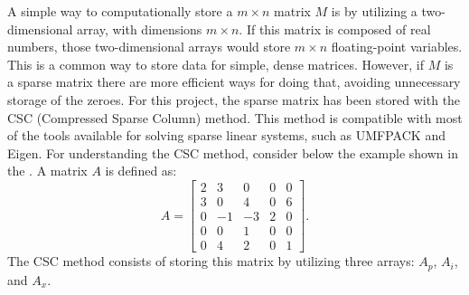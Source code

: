 A simple way to computationally store a $m \times n$ matrix $M$ is by utilizing a two-dimensional array, with dimensions $m \times n$. If this matrix is composed of real numbers, those two-dimensional arrays would store $m \times n$ floating-point variables. This is a common way to store data for simple, dense matrices. However, if $M$ is a sparse matrix there are more efficient ways for doing that, avoiding unnecessary storage of the zeroes. For this project, the sparse matrix has been stored with the CSC (Compressed Sparse Column) method. This method is compatible with most of the tools available for solving sparse linear systems, such as UMFPACK and Eigen. For understanding the CSC method, consider below the example shown in the \cite{Davis1995}. A matrix $A$ is defined as:
\begin{equation}
	A = 
	\begin{bmatrix}
	2	&3	&0	&0	&0\\
	3	&0	&4	&0	&6\\
	0	&-1	&-3	&2	&0\\
	0	&0	&1	&0	&0\\
	0	&4	&2	&0	&1
	\end{bmatrix}
	.
\end{equation}
The CSC method consists of storing this matrix by utilizing three arrays: $A_p$, $A_i$, and $A_x$. 

